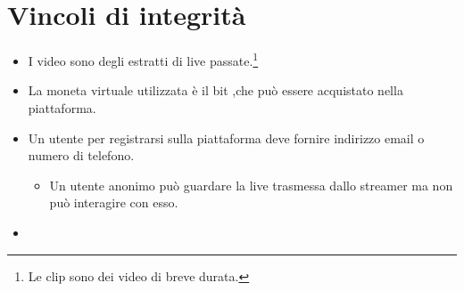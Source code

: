 \section{Vincoli di integrità}
\begin{itemize}
    \item I video sono degli estratti di live passate.\footnote{Le clip sono dei video di breve durata.}
    \item La moneta virtuale utilizzata è il bit ,che può essere acquistato nella piattaforma.
    \item Un utente per registrarsi sulla piattaforma deve fornire indirizzo email o numero di telefono.
    \begin{itemize}
        \item Un utente anonimo può guardare la live trasmessa dallo streamer ma non può interagire con esso. 
    \end{itemize}
    \item 
\end{itemize}